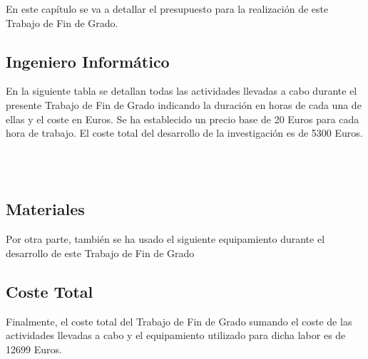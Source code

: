 

En este capítulo se va a detallar el presupuesto para la realización de este Trabajo de Fin de Grado.

\subsection{Ingeniero Informático}

En la siguiente tabla se detallan todas las actividades llevadas a cabo durante el presente Trabajo de Fin de Grado indicando la duración en horas de cada una de ellas y el coste en Euros. 
Se ha establecido un precio base de 20 Euros para cada hora de trabajo. El coste total del desarrollo de la investigación es de 5300 Euros.


\\
\bigskip    
\\

\subsection{Materiales}
Por otra parte, también se ha usado el siguiente equipamiento durante el desarrollo de este Trabajo de Fin de Grado




\subsection{Coste Total}
Finalmente, el coste total del Trabajo de Fin de Grado sumando el coste de las actividades llevadas a cabo y el equipamiento utilizado para dicha labor es de 12699 Euros.